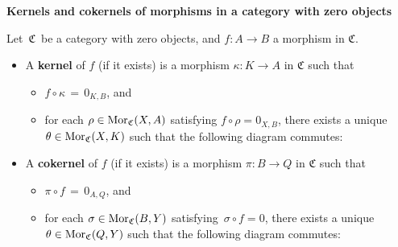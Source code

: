 
\vskip 1.0cm
\noindent
\textbf{\large Kernels and cokernels of morphisms in a category with zero objects}


\vskip 0.5cm
\begin{definition}
\mbox{}
\vskip 0.15cm
\noindent
Let \,$\mathfrak{C}$\, be a category with zero objects, and $f : A \longrightarrow B$ a morphism in $\mathfrak{C}$.
\begin{itemize}
\item
	A \textbf{kernel} of $f$ (if it exists) is a morphism $\kappa : K \longrightarrow A$ in $\mathfrak{C}$ such that
	\begin{itemize}
	\item
		\vskip -0.15cm
		$f \circ \kappa \,=\, 0_{K,B}$, and
	\item
		for each $\rho \in \Mor_{\mathfrak{C}}(X,A)$ satisfying $f \circ \rho = 0_{X,B}$,
		there exists a unique $\theta \in \Mor_{\mathfrak{C}}(X,K)$ such that the following diagram commutes:
		\begin{center}
		\end{center}
	\end{itemize}
\item
	A \textbf{cokernel} of $f$ (if it exists) is a morphism $\pi : B \longrightarrow Q$ in $\mathfrak{C}$ such that
	\begin{itemize}
	\item
		\vskip -0.15cm
		$\pi \circ f \,=\, 0_{A,Q}$, and
	\item
		for each $\sigma \in \Mor_{\mathfrak{C}}(B,Y)$ satisfying \,$\sigma \circ f = 0$,
		there exists a unique $\theta \in \Mor_{\mathfrak{C}}(Q,Y)$ such that the following diagram commutes:
		\begin{center}
		\begin{tikzcd}

\end{tikzcd}
\end{center}
\end{itemize}
\end{itemize}
\end{definition}
